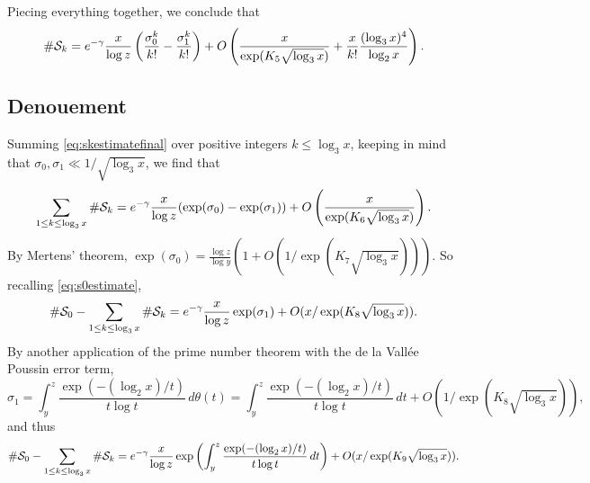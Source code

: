 \documentclass[11pt]{amsart}
\theoremstyle{remark}
\begin{document}
Piecing everything together, we conclude that
\begin{equation}\label{eq:skestimatefinal} \#\mathcal{S}_k = e^{-\gamma} \frac{x}{\log{z}}\left(\frac{\sigma_0^k}{k!} - \frac{\sigma_1^k}{k!}\right) + O\left(\frac{x}{\exp(K_5\sqrt{\log_3 x})} + \frac{x}{k!}\frac{(\log_3 x)^4}{\log_2 x}\right).\end{equation}
\subsection{Denouement}\label{sec:DayNewMa} Summing \eqref{eq:skestimatefinal} over positive integers $k\le \log_3 x$, keeping in mind that $\sigma_0, \sigma_1 \ll 1/\sqrt{\log_3 x}$, we find that
\[ \sum_{1\le k \le \log_3 x}\#\mathcal{S}_k = e^{-\gamma}\frac{x}{\log{z}} (\exp(\sigma_0)-\exp(\sigma_1)) + O\left(\frac{x}{\exp(K_6 \sqrt{\log_3 x})}\right).\]
By Mertens' theorem, $\exp(\sigma_0) = \frac{\log{z}}{\log{y}}\left(1 + O(1/\exp(K_7\sqrt{\log_3 x}))\right)$. So recalling \eqref{eq:s0estimate},
\[ \#\mathcal{S}_0 - \sum_{1\le k \le \log_3 x}\#\mathcal{S}_k = e^{-\gamma}\frac{x}{\log{z}} \exp(\sigma_1) + O(x/\exp(K_8 \sqrt{\log_3 x})). \]
By another application of the prime number theorem with the de la Vall\'ee Poussin error term,
\[ \sigma_1 = \int_{y}^{z} \frac{\exp(-(\log_2 x)/t)}{t\log{t}} \,d\theta(t) = \int_{y}^{z} \frac{\exp(-(\log_2 x)/t)}{t\log{t}} \,dt + O(1/\exp(K_8 \sqrt{\log_3 x})),\]
and thus
\begin{equation}\label{eq:sdiff} \#\mathcal{S}_0 - \sum_{1\le k \le \log_3 x}\#\mathcal{S}_k = e^{-\gamma} \frac{x}{\log{z}} \exp\left(\int_{y}^{z} \frac{\exp(-(\log_2 x)/t)}{t\log{t}} \,dt\right) + O(x/\exp(K_9 \sqrt{\log_3 x})). \end{equation}
\end{document}
